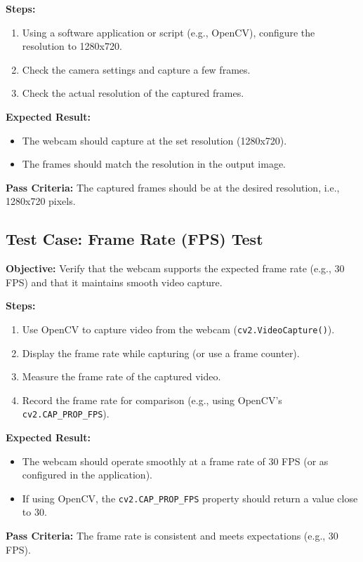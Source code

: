 \textbf{Steps:}
\begin{enumerate}
	\item Using a software application or script (e.g., OpenCV), configure the resolution to 1280x720.
	\item Check the camera settings and capture a few frames.
	\item Check the actual resolution of the captured frames.
\end{enumerate}

\textbf{Expected Result:}
\begin{itemize}
	\item The webcam should capture at the set resolution (1280x720).
	\item The frames should match the resolution in the output image.
\end{itemize}

\textbf{Pass Criteria:} 
The captured frames should be at the desired resolution, i.e., 1280x720 pixels. \cite{YWC:2024}

\subsection{Test Case: Frame Rate (FPS) Test}
\textbf{Objective:} Verify that the webcam supports the expected frame rate (e.g., 30 FPS) and that it maintains smooth video capture.

\textbf{Steps:}
\begin{enumerate}
	\item Use OpenCV to capture video from the webcam (\texttt{cv2.VideoCapture()}).
	\item Display the frame rate while capturing (or use a frame counter).
	\item Measure the frame rate of the captured video.
	\item Record the frame rate for comparison (e.g., using OpenCV's \texttt{cv2.CAP\_PROP\_FPS}).
\end{enumerate}

\textbf{Expected Result:}
\begin{itemize}
	\item The webcam should operate smoothly at a frame rate of 30 FPS (or as configured in the application).
	\item If using OpenCV, the \texttt{cv2.CAP\_PROP\_FPS} property should return a value close to 30.
\end{itemize}

\textbf{Pass Criteria:} 
The frame rate is consistent and meets expectations (e.g., 30 FPS).

